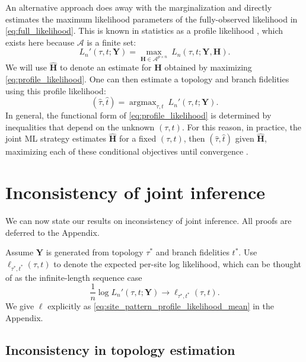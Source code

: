 \documentclass{article}
\newcommand{\alphabet}{\mathcal{A}}
\newcommand{\fullAlignment}{\mathbf{Y}}
\newcommand{\fullAncestralStates}{\mathbf{H}}
\newcommand{\nCols}{n}
\newcommand{\nAncestralStateRows}{p}
\DeclareMathOperator*{\argmax}{argmax}
\begin{document}
An alternative approach \cite{Sagulenko2017-jo} does away with the marginalization and directly estimates the maximum likelihood parameters of the fully-observed likelihood in \eqref{eq:full_likelihood}.
This is known in statistics as a profile likelihood \cite{Murphy2000-ry}, which exists here because $\alphabet$ is a finite set:
\begin{equation}
\label{eq:profile_likelihood}
L_\nCols'(\tau, t; \fullAlignment) = \max_{\fullAncestralStates\in\alphabet^{\nAncestralStateRows\times\nCols}} \ L_\nCols(\tau, t; \fullAlignment, \fullAncestralStates).
\end{equation}
We will use $\hat{\fullAncestralStates}$ to denote an estimate for $\fullAncestralStates$ obtained by maximizing \eqref{eq:profile_likelihood}.
One can then estimate a topology and branch fidelities using this profile likelihood:
\begin{equation}
\label{eq:profile_likelihood_topology_bl}
(\hat{\tau}, \hat{t}) = \argmax_{\tau, t} \ L_\nCols'(\tau, t; \fullAlignment).
\end{equation}
In general, the functional form of \eqref{eq:profile_likelihood} is determined by inequalities that depend on the unknown $(\tau,t)$.
For this reason, in practice, the joint ML strategy estimates $\hat{\fullAncestralStates}$ for a fixed $(\tau,t)$, then $(\hat{\tau},\hat{t})$ given $\hat{\fullAncestralStates}$, maximizing each of these conditional objectives until convergence \cite{Sagulenko2017-jo}.


\section*{Inconsistency of joint inference}

We can now state our results on inconsistency of joint inference.
All proofs are deferred to the Appendix.

Assume $\fullAlignment$ is generated from topology $\tau^*$ and branch fidelities $t^*$.
Use $\ell_{\tau^*,t^*}(\tau, t)$ to denote the expected per-site log likelihood, which can be thought of as the infinite-length sequence case
$$
\frac{1}{n}\log L_\nCols'(\tau, t; \fullAlignment) \rightarrow \ell_{\tau^*,t^*}(\tau, t).
$$
We give $\ell$ explicitly as \eqref{eq:site_pattern_profile_likelihood_mean} in the Appendix.

\subsection*{Inconsistency in topology estimation}
\end{document}
